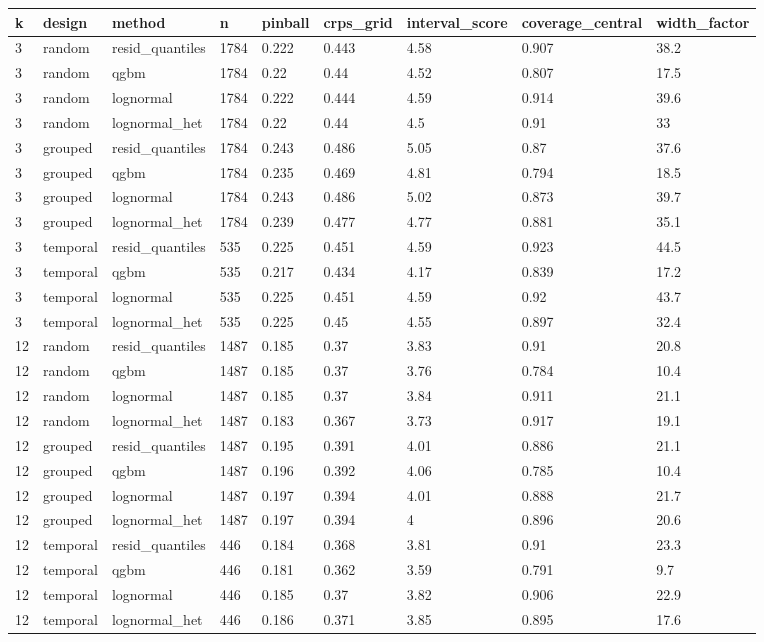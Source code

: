\begin{tabular}{lllllllll}
\toprule
k & design & method & n & pinball & crps\_grid & interval\_score & coverage\_central & width\_factor \\
\midrule
3 & random & resid\_quantiles & 1784 & 0.222 & 0.443 & 4.58 & 0.907 & 38.2 \\
3 & random & qgbm & 1784 & 0.22 & 0.44 & 4.52 & 0.807 & 17.5 \\
3 & random & lognormal & 1784 & 0.222 & 0.444 & 4.59 & 0.914 & 39.6 \\
3 & random & lognormal\_het & 1784 & 0.22 & 0.44 & 4.5 & 0.91 & 33 \\
3 & grouped & resid\_quantiles & 1784 & 0.243 & 0.486 & 5.05 & 0.87 & 37.6 \\
3 & grouped & qgbm & 1784 & 0.235 & 0.469 & 4.81 & 0.794 & 18.5 \\
3 & grouped & lognormal & 1784 & 0.243 & 0.486 & 5.02 & 0.873 & 39.7 \\
3 & grouped & lognormal\_het & 1784 & 0.239 & 0.477 & 4.77 & 0.881 & 35.1 \\
3 & temporal & resid\_quantiles & 535 & 0.225 & 0.451 & 4.59 & 0.923 & 44.5 \\
3 & temporal & qgbm & 535 & 0.217 & 0.434 & 4.17 & 0.839 & 17.2 \\
3 & temporal & lognormal & 535 & 0.225 & 0.451 & 4.59 & 0.92 & 43.7 \\
3 & temporal & lognormal\_het & 535 & 0.225 & 0.45 & 4.55 & 0.897 & 32.4 \\
12 & random & resid\_quantiles & 1487 & 0.185 & 0.37 & 3.83 & 0.91 & 20.8 \\
12 & random & qgbm & 1487 & 0.185 & 0.37 & 3.76 & 0.784 & 10.4 \\
12 & random & lognormal & 1487 & 0.185 & 0.37 & 3.84 & 0.911 & 21.1 \\
12 & random & lognormal\_het & 1487 & 0.183 & 0.367 & 3.73 & 0.917 & 19.1 \\
12 & grouped & resid\_quantiles & 1487 & 0.195 & 0.391 & 4.01 & 0.886 & 21.1 \\
12 & grouped & qgbm & 1487 & 0.196 & 0.392 & 4.06 & 0.785 & 10.4 \\
12 & grouped & lognormal & 1487 & 0.197 & 0.394 & 4.01 & 0.888 & 21.7 \\
12 & grouped & lognormal\_het & 1487 & 0.197 & 0.394 & 4 & 0.896 & 20.6 \\
12 & temporal & resid\_quantiles & 446 & 0.184 & 0.368 & 3.81 & 0.91 & 23.3 \\
12 & temporal & qgbm & 446 & 0.181 & 0.362 & 3.59 & 0.791 & 9.7 \\
12 & temporal & lognormal & 446 & 0.185 & 0.37 & 3.82 & 0.906 & 22.9 \\
12 & temporal & lognormal\_het & 446 & 0.186 & 0.371 & 3.85 & 0.895 & 17.6 \\
\bottomrule
\end{tabular}